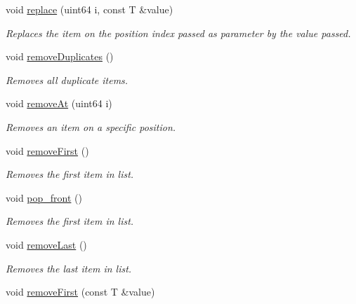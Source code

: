 \begin{DoxyCompactItemize}
void \mbox{\hyperlink{class_a_list_a745c812c22b1a3a8efdbe82eafd86f4b}{replace}} (uint64 i, const T \&value)
\begin{DoxyCompactList}\small\item\em Replaces the item on the position index passed as parameter by the value passed. \end{DoxyCompactList}\item 
\mbox{\label{class_a_list_a33f188595f0da046cced105c2e441506}} 
void \mbox{\hyperlink{class_a_list_a33f188595f0da046cced105c2e441506}{remove\+Duplicates}} ()
\begin{DoxyCompactList}\small\item\em Removes all duplicate items. \end{DoxyCompactList}\item 
void \mbox{\hyperlink{class_a_list_a4c5d1f1c0c6c8da99ac6279f1fea6a88}{remove\+At}} (uint64 i)
\begin{DoxyCompactList}\small\item\em Removes an item on a specific position. \end{DoxyCompactList}\item 
\mbox{\label{class_a_list_ada980037299e3dcbf05b50977216f32d}} 
void \mbox{\hyperlink{class_a_list_ada980037299e3dcbf05b50977216f32d}{remove\+First}} ()
\begin{DoxyCompactList}\small\item\em Removes the first item in list. \end{DoxyCompactList}\item 
void \mbox{\hyperlink{class_a_list_a2240edc5f38fa7e57a868bb30b747c51}{pop\+\_\+front}} ()
\begin{DoxyCompactList}\small\item\em Removes the first item in list. \end{DoxyCompactList}\item 
\mbox{\label{class_a_list_aff8e5c3e3f879ea5c8d6d9e29b321fc9}} 
void \mbox{\hyperlink{class_a_list_aff8e5c3e3f879ea5c8d6d9e29b321fc9}{remove\+Last}} ()
\begin{DoxyCompactList}\small\item\em Removes the last item in list. \end{DoxyCompactList}\item 
void \mbox{\hyperlink{class_a_list_aa4ac4af0fb772a55168ddcba13c508c3}{remove\+First}} (const T \&value)

\end{DoxyCompactItemize}
